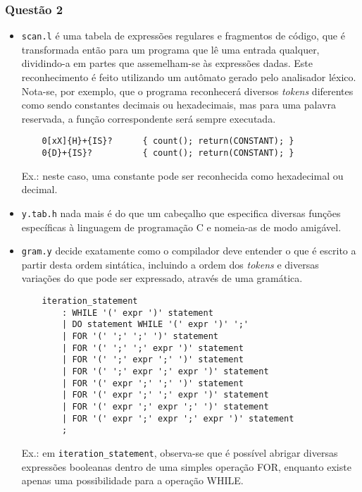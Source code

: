 \documentclass{article}
\begin{document}
\subsubsection*{Questão 2}
\begin{itemize}
    \item \texttt{scan.l} é uma tabela de expressões regulares e fragmentos de código, que é transformada então para um programa que lê uma entrada qualquer, dividindo-a em partes que assemelham-se às expressões dadas. Este reconhecimento é feito utilizando um autômato gerado pelo analisador léxico. Nota-se, por exemplo, que o programa reconhecerá diversos \textit{tokens} diferentes como sendo constantes decimais ou hexadecimais, mas para uma palavra reservada, a função correspondente será sempre executada.

    \begin{verbatim}
    0[xX]{H}+{IS}?      { count(); return(CONSTANT); }
    0{D}+{IS}?          { count(); return(CONSTANT); } \end{verbatim}
    
    Ex.: neste caso, uma constante pode ser reconhecida como hexadecimal ou decimal.

    \item \texttt{y.tab.h} nada mais é do que um cabeçalho que especifica diversas funções específicas à linguagem de programação C e nomeia-as de modo amigável.

    \item \texttt{gram.y} decide exatamente como o compilador deve entender o que é escrito a partir desta ordem sintática, incluindo a ordem dos \textit{tokens} e diversas variações do que pode ser expressado, através de uma gramática.

    \begin{verbatim}
    iteration_statement
        : WHILE '(' expr ')' statement
        | DO statement WHILE '(' expr ')' ';'
        | FOR '(' ';' ';' ')' statement
        | FOR '(' ';' ';' expr ')' statement
        | FOR '(' ';' expr ';' ')' statement
        | FOR '(' ';' expr ';' expr ')' statement
        | FOR '(' expr ';' ';' ')' statement
        | FOR '(' expr ';' ';' expr ')' statement
        | FOR '(' expr ';' expr ';' ')' statement
        | FOR '(' expr ';' expr ';' expr ')' statement
        ; \end{verbatim}

    Ex.: em \texttt{iteration\_statement}, observa-se que é possível abrigar diversas expressões booleanas dentro de uma simples operação FOR, enquanto existe apenas uma possibilidade para a operação WHILE. 
\end{itemize}
\end{document}
